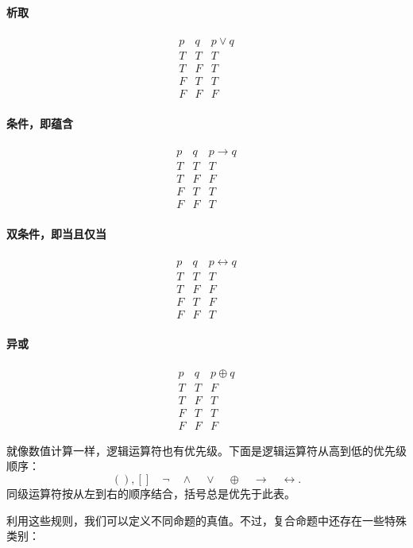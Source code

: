 \paragraph{析取}
\[
\begin{array}{c|c|c}
p & q & p\vee q \\
\hline
T & T & T \\
T & F & T \\
F & T & T \\
F & F & F
\end{array}
\]

\paragraph{条件，即蕴含}
\[
\begin{array}{c|c|c}
p & q & p\to q \\
\hline
T & T & T \\
T & F & F \\
F & T & T \\
F & F & T
\end{array}
\]

\paragraph{双条件，即当且仅当}
\[
\begin{array}{c|c|c}
p & q & p\leftrightarrow q \\
\hline
T & T & T \\
T & F & F \\
F & T & F \\
F & F & T
\end{array}
\]

\paragraph{异或}
\[
\begin{array}{c|c|c}
p & q & p\oplus q \\
\hline
T & T & F \\
T & F & T \\
F & T & T \\
F & F & F
\end{array}
\]

就像数值计算一样，逻辑运算符也有优先级。下面是逻辑运算符从高到低的优先级顺序：
\[
( ), [ ] \quad \neg \quad \wedge \quad \vee \quad \oplus \quad \to \quad \leftrightarrow.
\]
同级运算符按从左到右的顺序结合，括号总是优先于此表。

利用这些规则，我们可以定义不同命题的真值。不过，复合命题中还存在一些特殊类别：

